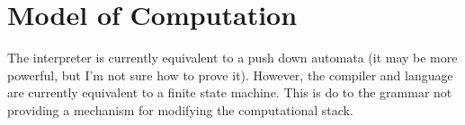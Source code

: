 \documentclass{report}
\begin{document}
	


\chapter{Model of Computation}
	The interpreter is currently equivalent to a push down automata (it may be more powerful, but I'm not sure how to prove it). However, the compiler and language are currently equivalent to a finite state machine. This is do to the grammar not providing a mechanism for modifying the computational stack.
\end{document}
